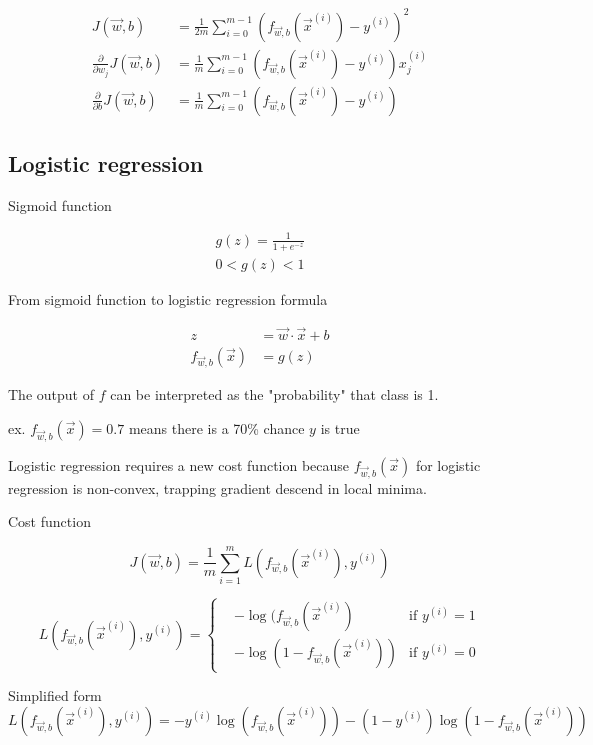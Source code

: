 \documentclass[12pt]{article}
\begin{document}
\begin{align*}
J(\vec{w},b) &= \frac{1}{2m} \sum_{i=0}^{m-1} (f_{\vec{w},b}(\vec{x}^{(i)}) - y^{(i)})^2\\
\frac{\partial}{\partial w_j} J(\vec{w},b) &= \frac{1}{m} \sum_{i=0}^{m-1} (f_{\vec{w},b}(\vec{x}^{(i)}) - y^{(i)}) x_j^{(i)}\\
\frac{\partial}{\partial b} J(\vec{w},b) &= \frac{1}{m} \sum_{i=0}^{m-1} (f_{\vec{w},b}(\vec{x}^{(i)}) - y^{(i)})
\end{align*}

\subsection{Logistic regression}

Sigmoid function

\begin{gather*}
g(z) = \frac{1}{1 + e^{-z}}\\
0 < g(z) < 1
\end{gather*}

From sigmoid function to logistic regression formula

\begin{align*}
z &= \vec{w} \cdot \vec{x} + b\\
f_{\vec{w},b}(\vec{x}) &= g(z)
\end{align*}

The output of $f$ can be interpreted as the "probability" that class is 1.

ex. $f_{\vec{w},b}(\vec{x}) = 0.7$ means there is a 70\% chance $y$ is true

Logistic regression requires a new cost function because $f_{\vec{w},b}(\vec{x})$ for logistic regression is non-convex, trapping gradient descend in local minima.

Cost function

\[ J(\vec{w},b) = \frac{1}{m} \sum_{i=1}^{m} L(f_{\vec{w},b}(\vec{x}^{(i)}),y^{(i)}) \]

\begin{equation*}
L(f_{\vec{w},b}(\vec{x}^{(i)}),y^{(i)}) = 
  \left\{
    \begin{aligned}
      & -\log(f_{\vec{w},b}(\vec{x}^{(i)}) & \text{if } y^{(i)} = 1 \\
      & -\log(1 - f_{\vec{w},b}(\vec{x}^{(i)})) & \text{if } y^{(i)} = 0
    \end{aligned}
  \right.
\end{equation*}

Simplified form
\[ L(f_{\vec{w},b}(\vec{x}^{(i)}), y^{(i)}) = -y^{(i)} \log(f_{\vec{w},b}(\vec{x}^{(i)})) - (1 - y^{(i)}) \log (1 - f_{\vec{w},b}(\vec{x}^{(i)})) \]
\end{document}
